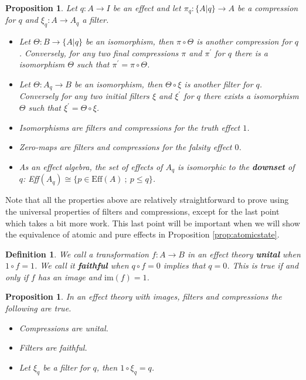 \documentclass[a4paper,onecolumn,10pt,accepted=2019-05-03, issue=1, volume=1, shorttitle=papers/compositionality-1-1]{compositionalityarticle}
\newcounter{counter}
\numberwithin{counter}{section}
\newtheorem{proposition}[counter]{Proposition}
\newtheorem{definition}[counter]{Definition}
\newcommand{\im}[1]{\text{im}(#1)}
\begin{document}
\begin{proposition} \label{prop:quotcompr}
	\cite{cho2015introduction} Let $q:A\rightarrow I$ be an effect and let $\pi_q:\{A\lvert q\}\rightarrow A$ be a compression for $q$ and $\xi_q:A\rightarrow A_q$ a filter. 
	\begin{itemize}
		\item Let $\Theta:B\rightarrow \{A\lvert q\}$ be an isomorphism, then $\pi\circ \Theta$ is another compression for $q$. Conversely, for any two final compressions $\pi$ and $\pi^\prime$ for $q$ there is a isomorphism $\Theta$ such that $\pi^\prime = \pi\circ \Theta$.
		\item Let $\Theta:A_q\rightarrow B$ be an isomorphism, then $\Theta\circ \xi$ is another filter for $q$. Conversely for any two initial filters $\xi$ and $\xi^\prime$ for $q$ there exists a isomorphism $\Theta$ such that $\xi^\prime = \Theta\circ \xi$.
		\item Isomorphisms are filters and compressions for the truth effect $1$.
		\item Zero-maps are filters and compressions for the falsity effect $0$.
		\item As an effect algebra, the set of effects of $A_q$ is isomorphic to the \textbf{downset} of $q$: Eff$(A_q)\cong \{p \in \text{Eff}(A)~;~ p\leq q\}$.
	\end{itemize}
\end{proposition}

Note that all the properties above are relatively straightforward to prove using the universal properties of filters and compressions, except for the last point which takes a bit more work. This last point will be important when we will show the equivalence of atomic and pure effects in Proposition \ref{prop:atomicstate}.

\begin{definition}
	We call a transformation $f:A\rightarrow B$ in an effect theory \textbf{unital} when $1\circ f = 1$. We call it \textbf{faithful} when $q\circ f = 0$ implies that $q=0$. This is true if and only if $f$ has an image and $\im{f}=1$.
\end{definition}

\begin{proposition}\label{prop:faithfulfilters}
	\cite{cho2015introduction,basthesis} In an effect theory with images, filters and compressions the following are true.
	\begin{itemize}
		\item Compressions are unital.
		\item Filters are faithful.
        \item Let $\xi_q$ be a filter for $q$, then $1\circ \xi_q = q$.
	\end{itemize}
\end{proposition}
\end{document}

